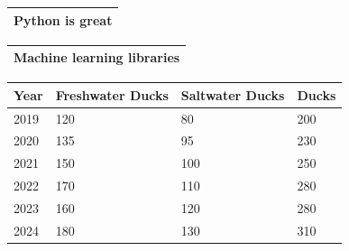 \documentclass[11pt,a4paper]{article}
\begin{document}
\begin{table}[h]
\begin{tabular}{|l|}
\hline
Python is great \\ \hline
\end{tabular}
\end{table}

\begin{table}[h]
\begin{tabular}{|l|}
\hline
Machine learning libraries \\ \hline
\end{tabular}
\end{table}

\begin{table}[h]
\begin{tabular}{|l|l|l|l|}
\hline
Year & Freshwater Ducks & Saltwater Ducks & Ducks \\ \hline
2019 & 120 & 80 & 200 \\ \hline
2020 & 135 & 95 & 230 \\ \hline
2021 & 150 & 100 & 250 \\ \hline
2022 & 170 & 110 & 280 \\ \hline
2023 & 160 & 120 & 280 \\ \hline
2024 & 180 & 130 & 310 \\ \hline
\end{tabular}
\end{table}
\end{document}
